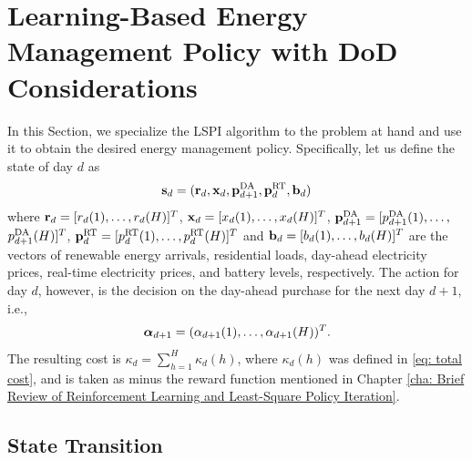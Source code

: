 \chapter{Learning-Based Energy Management Policy with DoD Considerations}\label{cha: Learning-Based Energy Management Policy with DoD Considerations}

In this Section, we specialize the LSPI algorithm to the problem at hand and use it to obtain the desired energy management policy. Specifically, let us define the state of day $d$ as
\begin{equation}
  {\mathbf s}_d = ({\mathbf r}_d, {\mathbf x}_d, {\mathbf p}^\text{DA}_{d+1}, {\mathbf p}^\text{RT}_d, {\mathbf b}_d)
\end{equation}
where ${\mathbf r}_d=[r_d(1), \ldots, r_d(H)]^T$, ${\mathbf x}_d=[x_d(1), \ldots, x_d(H)]^T$, ${\mathbf p}^{\text{DA}}_{d+1}=[p^{\text{DA}}_{d+1}(1), \ldots,$
$p^{\text{DA}}_{d+1}(H)]^T$, ${\mathbf p}^{\text{RT}}_d=[p^{\text{RT}}_d(1), \ldots, p^{\text{RT}}_d(H)]^T$ and ${\mathbf b}_d=[b_d(1), \ldots, b_d(H)]^T$ are the vectors of renewable energy arrivals, residential loads, day-ahead electricity prices, real-time electricity prices, and battery levels, respectively. The action for day $d$, however, is the decision on the day-ahead purchase for the next day $d+1$, i.e.,
\begin{equation}
    \boldsymbol{\alpha}_{d+1} = (\alpha_{d+1}(1), \ldots, \alpha_{d+1}(H))^T.
\end{equation}
The resulting cost is $\kappa_d = \sum_{h=1}^{H} \kappa_d(h)$, where $\kappa_d(h)$ was defined in \eqref{eq: total cost}, and is taken as minus the reward function mentioned in Chapter \ref{cha: Brief Review of Reinforcement Learning and Least-Square Policy Iteration}.

\section{State Transition}

